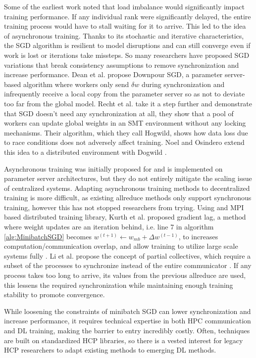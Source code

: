 Some of the earliest work noted that load imbalance would significantly impact training performance. 
If any individual rank were significantly delayed, the entire training process would have to stall waiting for it to arrive.
This led to the idea of asynchronous training.
Thanks to its stochastic and iterative characteristics, the SGD algorithm is resilient to model disruptions and can still converge even if work is lost or iterations take missteps.
So many researchers have proposed SGD variations that break consistency assumptions to remove synchronization and increase performance.
Dean et al. \cite{Dean2012DistBelif} propose Downpour SGD, a parameter server-based algorithm where workers only send $\delta w$ during synchronization and infrequently receive a local copy from the parameter server so as not to deviate too far from the global model. 
Recht et al. \cite{Recht2011HogWild} take it a step further and demonstrate that SGD doesn't need any synchronization at all, they show that a pool of workers can update global weights in an SMT environment without any locking mechanisms.
Their algorithm, which they call Hogwild, shows how data loss due to race conditions does not adversely affect training.
Noel and Osindero extend this idea to a distributed environment with Dogwild \cite{Noel2014Dogwild}.

Asynchronous training was initially proposed for and is implemented on parameter server architectures, but they do not entirely mitigate the scaling issue of centralized systems.
Adapting asynchronous training methods to decentralized training is more difficult, as existing allreduce methods only support synchronous training, however this has not stopped researchers from trying.
Using and MPI based distributed training library, Kurth et al. proposed gradient lag, a method where weight updates are an iteration behind, i.e. line 7 in algorithm \ref{alg:MinibatchSGD} becomes $w^{(t+1)}\leftarrow w_{mb} + \Delta w^{(t-1)}$, to increases computation/communication overlap, and allow training to utilize large scale systems fully \cite{Kurth2018ExascaleDLClimate}.
Li et al. propose the concept of partial collectives, which require a subset of the processes to synchronize instead of the entire communicator \cite{Li2020DLPartialColl}.
If any process takes too long to arrive, its values from the previous allreduce are used, this lessens the required synchronization while maintaining enough training stability to promote convergence.

While loosening the constraints of minibatch SGD can lower synchronization and increase performance, it requires technical expertise in both HPC communication and DL training, making the barrier to entry incredibly costly.
Often, techniques are built on standardized HCP libraries, so there is a vested interest for legacy HCP researchers to adapt existing methods to emerging DL methods.

